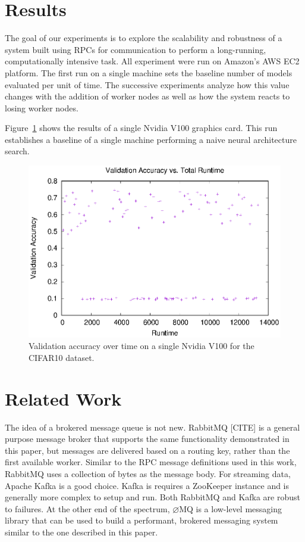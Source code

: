 \documentclass[conference]{IEEEtran}
\begin{document}
\section{Results}
The goal of our experiments is to explore the scalability and robustness
of a system built using RPCs for communication to perform a long-running,
computationally intensive task. All experiment were run on Amazon's
AWS EC2 platform. The first run on a single machine sets the baseline
number of models evaluated per unit of time. The successive experiments
analyze how this value changes with the addition of worker nodes as well
as how the system reacts to losing worker nodes.

Figure~\ref{fig:single-val} shows the results of a single Nvidia V100
graphics card. This run establishes a baseline of a single machine
performing a naive neural architecture search.

\begin{figure}
  \centering
  \includegraphics[width=\columnwidth]{result/output/single_worker}
  \caption{Validation accuracy over time on a single Nvidia V100 for
    the CIFAR10 dataset.}
  \label{fig:single-val}
\end{figure}
\section{Related Work}
The idea of a brokered message queue is not new. RabbitMQ [CITE] is a general
purpose message broker that supports the same functionality demonstrated
in this paper, but messages are delivered based on a routing key, rather than
the first available worker. Similar to the RPC message definitions used in
this work, RabbitMQ uses a collection of bytes as the message body. For
streaming data, Apache Kafka \cite{kafka} is a good choice. Kafka is requires a
ZooKeeper \cite{Hunt:2010:ZWC:1855840.1855851} instance and is generally
more complex to setup and run.
Both RabbitMQ and Kafka are robust to failures. At the other end of the
spectrum, $\varnothing$MQ is a low-level messaging library that can be used
to build a performant, brokered messaging system similar to the one described
in this paper.
\end{document}
